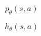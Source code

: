 \documentclass[12pt]{report}
\begin{document}
$$ p_\theta(s, a)$$

\newpage 

$$h_\theta(s, a)$$
\end{document}
